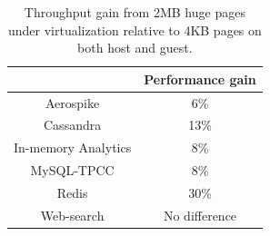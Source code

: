 

\begin{table}[t]
\begin{center}
\begin{tabular}{|c|c|}
\hline
&Performance gain\\
\hline
Aerospike&6\%\\
\hline
Cassandra&13\% \\
\hline
In-memory Analytics&8\% \\
\hline
MySQL-TPCC&8\% \\
\hline
Redis&30\%\\
\hline
Web-search&No difference\\
\hline
\end{tabular}
\caption{Throughput gain from 2MB huge pages under virtualization relative to
4KB pages on both host and guest.}
\label{tab:thp-benefit}
\end{center}
\end{table}

